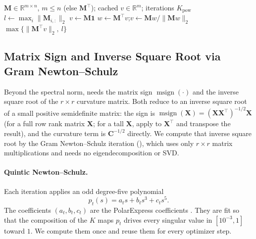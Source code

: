 \documentclass{article}
\newcommand{\mat}[1]{\bm{#1}}
\DeclareMathOperator{\msign}{msign}          %
\newcommand{\norm}[1]{\| #1\|}
\begin{document}
\begin{algorithm}[ht]
\caption{Guarded spectral-norm estimate of $\norm{\mat{M}}_2$}
\label{alg:smax}
\begin{algorithmic}[1]
\Require $\mat{M}\in\mathbb{R}^{m\times n}$, $m\le n$ (else $\mat{M}^\top$); cached $v\in\mathbb{R}^m$; iterations $K_{\mathrm{pow}}$
\State $l \gets \max_i\norm{\mat{M}_{i,:}}_2$
 
  \State $v\gets \mat{M}\mathbf{1}$
\EndIf
{} \Comment{iterate the smaller Gram $\mat{M}\mat{M}^\top$}
  \State $w\gets \mat{M}^\top v$;\quad $v\gets \mat{M}w/\norm{\mat{M}w}_2$
\EndFor
\State \Return $\max\big\{\norm{\mat{M}^\top v}_2,\ l\big\}$
\end{algorithmic}
\end{algorithm}

\subsection{Matrix Sign and Inverse Square Root via Gram Newton--Schulz}
\label{app:gramns}

Beyond the spectral norm,  needs the matrix sign $\msign(\cdot)$
and the inverse square root of the $r \times r$ curvature matrix.  Both reduce to
an inverse square root of a small positive semidefinite matrix: the sign is
$\msign(\mat{X})=(\mat{X}\mat{X}^\top)^{-1/2}\mat{X}$ (for a full row rank matrix $\mat{X}$; for a tall $\mat{X}$, apply to $\mat{X}^\top$ and transpose the result), and the curvature term is $\mat{C}^{-1/2}$ directly.  We
compute that inverse square root by the Gram Newton--Schulz iteration
\cite{gram_ns} (), which uses only $r\times r$ matrix
multiplications and needs no eigendecomposition or SVD.

\paragraph{Quintic Newton--Schulz.}
Each iteration applies an odd degree-five polynomial
\begin{equation}\label{e-gram-ns-poly}
    p_t(s)
    =
    a_t s + b_t s^3 + c_t s^5 .
\end{equation}
The coefficients $(a_t,b_t,c_t)$ are the PolarExpress coefficients
\cite{polarexpress}. They are fit so that the composition of the $K$ maps
$p_t$ drives every singular value in $[10^{-3},1]$ toward $1$. We compute
them once and reuse them for every optimizer step.
\end{document}
